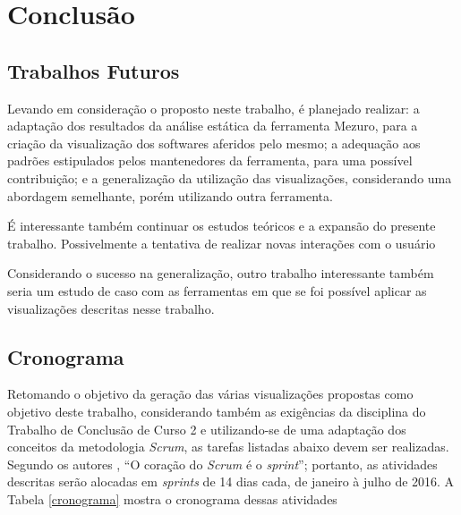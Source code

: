 \chapter[Conclusão]{Conclusão}

\section{Trabalhos Futuros}

Levando em consideração o proposto neste trabalho, é planejado realizar: a
adaptação dos resultados da análise estática da ferramenta Mezuro, para a
criação da visualização dos softwares aferidos pelo mesmo; a adequação aos
padrões estipulados pelos mantenedores da ferramenta, para uma possível
contribuição; e a generalização da utilização das visualizações, considerando uma
abordagem semelhante, porém utilizando outra ferramenta.

É interessante também continuar os estudos teóricos e a expansão do presente
trabalho. Possivelmente a tentativa de realizar novas interações com o usuário

Considerando o sucesso na generalização, outro trabalho interessante também
seria um estudo de caso com as ferramentas em que se foi possível aplicar as
visualizações descritas nesse trabalho.

\section{Cronograma}


Retomando o objetivo da geração das várias visualizações propostas como
objetivo deste trabalho, considerando também as exigências da disciplina do
Trabalho de Conclusão de Curso 2 e utilizando-se de uma adaptação dos conceitos
da metodologia \textit{Scrum}, as tarefas listadas abaixo devem ser realizadas.
Segundo os autores , ``O coração do
\textit{Scrum} é o \textit{sprint}''; portanto, as atividades descritas serão
alocadas em \textit{sprints} de 14 dias cada, de janeiro à julho de 2016. A
Tabela \ref{cronograma} mostra o cronograma dessas atividades

